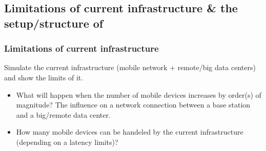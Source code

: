 \subsection{Limitations of current infrastructure \& the setup/structure of \xcloud}
\subsubsection{Limitations of current infrastructure}
Simulate the current infrastructure (mobile network + remote/big data centers) and show the limits of it.
\begin{itemize}
\item What will happen when the number of mobile devices increases by order(s) of magnitude? The influence on a network connection between a base station and a big/remote data center.
\item How many mobile devices can be handeled by the current infrastructure (depending on a latency limits)?
\end{itemize}